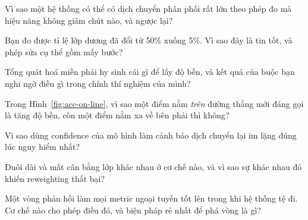 \documentclass[../../deep_learning.tex]{subfiles}
\begin{document}
\begin{tukiem}
\item Vì sao một hệ thống có thể có dịch chuyển phân phối rất lớn theo phép đo mà hiệu năng không giảm chút nào, và ngược lại?
\item Bạn đo được tỉ lệ lớp dương đã đổi từ 50\%
 xuống 5\%. Vì sao đây là tin tốt, và phép sửa cụ thể gồm mấy bước?
\item Tổng quát hoá miền phải hy sinh cái gì để lấy độ bền, và kết quả của \cite{gulrajani2021search} buộc bạn nghi ngờ điều gì trong chính thí nghiệm của mình?
\item Trong Hình~\ref{fig:acc-on-line}, vì sao một điểm nằm \emph{trên} đường thẳng mới đáng gọi là tăng độ bền, còn một điểm nằm xa về bên phải thì không?
\item Vì sao dùng confidence của mô hình làm cảnh báo dịch chuyển lại im lặng đúng lúc nguy hiểm nhất?
\item Đuôi dài và mất cân bằng lớp khác nhau ở cơ chế nào, và vì sao sự khác nhau đó khiến reweighting thất bại?
\item Một vòng phản hồi làm mọi metric ngoại tuyến tốt lên trong khi hệ thống tệ đi. Cơ chế nào cho phép điều đó, và biện pháp rẻ nhất để phá vòng là gì?
\end{tukiem}
\ifSubfilesClassLoaded{\printbibliography[title={Nguồn}]}{}
\end{document}
